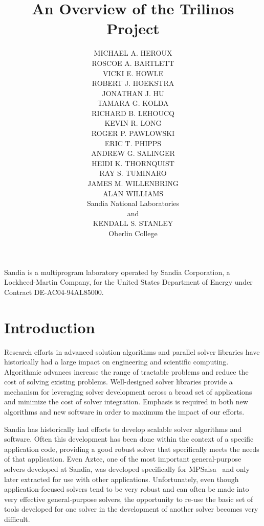 \documentclass[acmtoms,acmnow]{acmtrans2m}
\title{An Overview of the Trilinos Project}
\author{MICHAEL A. HEROUX \\ 
ROSCOE A. BARTLETT \\
VICKI E. HOWLE \\
ROBERT J. HOEKSTRA \\
JONATHAN J. HU \\
TAMARA G. KOLDA \\
RICHARD B. LEHOUCQ \\
KEVIN R. LONG \\
ROGER P. PAWLOWSKI \\
ERIC T. PHIPPS \\
ANDREW G. SALINGER \\
HEIDI K. THORNQUIST \\
RAY S. TUMINARO \\
JAMES M. WILLENBRING \\
ALAN WILLIAMS \\
Sandia National Laboratories \\
and \\
KENDALL S. STANLEY \\
Oberlin College}
\begin{document}




\begin{bottomstuff}
Sandia is a multiprogram laboratory operated by Sandia Corporation, a
Lockheed-Martin Company, for the United States Department of Energy
under Contract DE-AC04-94AL85000.

\end{bottomstuff}

\maketitle


\section{Introduction}

Research efforts in advanced solution algorithms and parallel solver
libraries have historically had a large impact on engineering and
scientific computing.  Algorithmic advances increase the range
of tractable problems and reduce the cost of solving existing
problems.  Well-designed solver libraries provide a mechanism for
leveraging solver development across a broad set of applications and
minimize the cost of solver integration.  Emphasis is
required in both new algorithms and new software in order
to maximum the impact of our efforts.

Sandia has historically had efforts to develop scalable solver algorithms 
and software.  Often this development has been done within the context of 
a specific application code, providing a good robust solver that 
specifically meets the needs of that application.  Even Aztec, one of 
the most important general-purpose solvers developed at Sandia, was 
developed specifically for MPSalsa~\cite{MPSalsa-User-Guide,MPSalsa-Theory} 
and only later extracted for use with other applications.  Unfortunately, 
even though application-focused solvers tend to be very robust and can 
often be made into very effective general-purpose solvers, the 
opportunity to re-use the basic set of tools developed for one solver 
in the development of another solver becomes very difficult.
\end{document}

